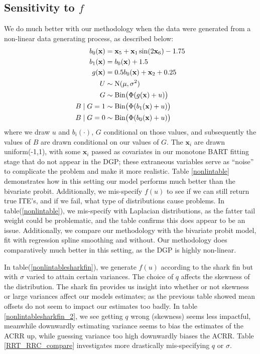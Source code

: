 \documentclass[aoas,preprint, 11pt, dvipsnames, table, x11name]{imsart}
\renewcommand{\bm}[1]{\mathbf{#1}}
\theoremstyle{remark}
\begin{document}
\subsection{Sensitivity to $f$}\label{nonlindgp}



We do much better with our methodology when the data were generated from a non-linear data generating process, as described below:
\begin{align}
	\begin{split}
		b_0(\bm{x})&=\bm{x}_5+\bm{x}_1 \sin(2\bm{x}_6)-1.75\\
		b_1(\bm{x})&=b_0(\bm{x})+1.5\\
		g(\bm{x})&=0.5 b_0(\bm{x})+\bm{x}_2+0.25\\
		U&\sim \mbox{N}(\mu,\sigma^2)\\
		G&\sim \text{Bin}\qty(\Phi(g(\bm{x})+u)) \\
		B\mid G=1&\sim\text{Bin}\qty(\Phi(b_1(\bm{x})+u))\\
		B\mid G=0&\sim \text{Bin}\qty(\Phi(b_0(\bm{x})+u))
	\end{split}
	\label{newnonlinmodel}
\end{align}
where we draw $u$ and $b_i(\cdot)$, $G$ conditional on those values, and subsequently  the values of $B$ are drawn conditional on our values of $G$. The $\bm{x}_i$ are drawn uniform(-1,1), with some $\bm{x}_i$ passed as covariates in our monotone BART fitting stage that do not appear in the DGP; these extraneous variables serve as ``noise'' to complicate the problem and make it more realistic.  Table \ref{nonlintable} demonstrates how in this setting our model performs much better than the bivariate probit.
Additionally, we mis-specify $f(u)$ to see if we can still return true ITE's, and if we fail, what type of distributions cause problems.  In table(\ref{nonlintable}), we mis-specify with Laplacian distributions, as the fatter tail weight could be problematic, and the table confirms this does appear to be an issue.  Additionally, we compare our methodology with the bivariate probit model, fit with regression spline smoothing and without.  Our methodology does comparatively much better in this setting, as the DGP is highly non-linear. 

In table(\ref{nonlintablesharkfin}), we generate $f(u)$ according to the shark fin but with $\sigma$ varied to attain certain variances.  The choice of $q$ affects the skewness of the distribution.  The shark fin provides us insight into whether or not skewness or large variances affect our models estimates; as the previous table showed mean offsets do not seem to impact our estimates too badly.   In table \ref{nonlintablesharkfin_2}, we see getting $q$ wrong (skewness) seems less impactful, meanwhile downwardly estimating variance seems to bias the estimates of the ACRR up, while guessing variance too high downwardly biases the ACRR.  Table \ref{RRT_RRC_compare} investigates more drastically mis-specifying $q$ or $\sigma$.
\end{document}
